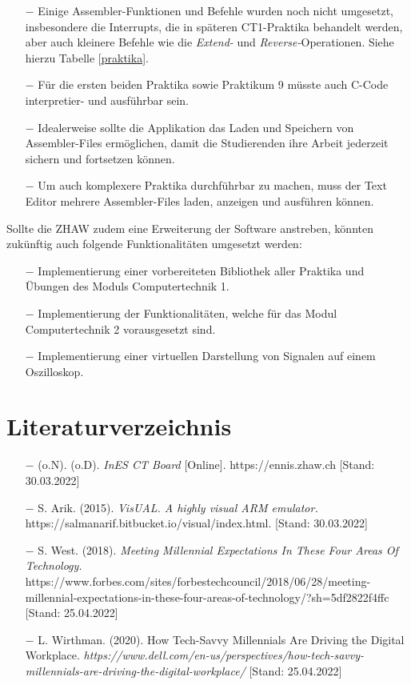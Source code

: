 \documentclass[10pt]{article}
\begin{document}
\begin{itemize}
	\item[$-$] Einige Assembler-Funktionen und Befehle wurden noch nicht umgesetzt, insbesondere die Interrupts, die in späteren CT1-Praktika behandelt werden, aber auch kleinere Befehle wie die \emph{Extend-} und \emph{Reverse-}Operationen. Siehe hierzu Tabelle \ref{praktika}.
	\item[$-$] Für die ersten beiden Praktika sowie Praktikum 9 müsste auch C-Code interpretier- und ausführbar sein.
	\item[$-$] Idealerweise sollte die Applikation das Laden und Speichern von Assembler-Files ermöglichen, damit die Studierenden ihre Arbeit jederzeit sichern und fortsetzen können.
	\item[$-$] Um auch komplexere Praktika durchführbar zu machen, muss der Text Editor mehrere Assembler-Files laden, anzeigen und ausführen können.


\end{itemize}


Sollte die ZHAW zudem eine Erweiterung der Software anstreben, könnten zukünftig auch folgende Funktionalitäten umgesetzt werden: 
\begin{itemize}
\item[$-$] Implementierung einer vorbereiteten Bibliothek aller Praktika und Übungen des Moduls \glqq Computertechnik 1\grqq. 
\item[$-$] Implementierung der Funktionalitäten, welche für das Modul \glqq Computertechnik 2\grqq{} vorausgesetzt sind. 
\item[$-$] Implementierung einer virtuellen Darstellung von Signalen auf einem Oszilloskop.
\end{itemize}

\section{Literaturverzeichnis}

\begin{itemize}

\item[$-$] (o.N). (o.D). \emph{InES CT Board} [Online]. https://ennis.zhaw.ch [Stand: 30.03.2022]
\item[$-$] S. Arik. (2015). \emph{VisUAL. A highly visual ARM emulator.} https://salmanarif.bitbucket.io/visual/index.html. [Stand: 30.03.2022]
\item[$-$] S. West. (2018). \emph{Meeting Millennial Expectations In These Four Areas Of Technology.} https://www.forbes.com/sites/forbestechcouncil/2018/06/28/meeting-millennial-expectations-in-these-four-areas-of-technology/?sh=5df2822f4ffc [Stand: 25.04.2022]
\item[$-$] L. Wirthman. (2020). How Tech-Savvy Millennials Are Driving the Digital Workplace. \emph{https://www.dell.com/en-us/perspectives/how-tech-savvy-millennials-are-driving-the-digital-workplace/} [Stand: 25.04.2022]

\end{itemize}
\end{document}
